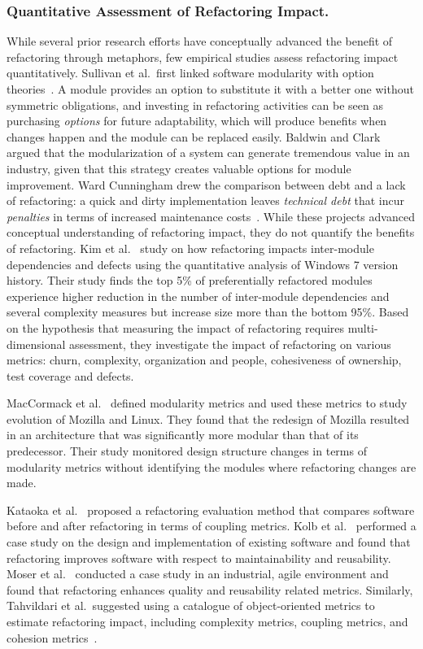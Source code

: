 \subsubsection{Quantitative Assessment of Refactoring Impact.} 
\label{sec:refactoringassessment} 
While several prior research efforts have conceptually advanced the benefit of refactoring through metaphors, few empirical studies assess refactoring impact quantitatively. Sullivan et al.~first linked software modularity with option theories~\cite{Sullivan1998:option}. A module provides an option to substitute it with a better one without symmetric obligations, and investing in refactoring activities can be seen as purchasing \emph{options} for future adaptability, which will produce benefits when changes happen and the module can be replaced easily. Baldwin and Clark~\cite{Baldwin1999:designrule} argued that the modularization of a system can generate tremendous value in an industry, given that this strategy creates valuable options for module improvement. Ward Cunningham drew the comparison between debt and a lack of refactoring: a quick and dirty implementation leaves {\em technical debt} that incur \emph{penalties} in terms of increased maintenance costs~\cite{Cunningham1992:td}. While these projects advanced conceptual understanding of refactoring impact, they do not quantify the benefits of refactoring.  Kim et al.~\cite{Kim2014:EmpiricalStudy} study on how refactoring impacts inter-module dependencies and defects using the quantitative analysis of Windows 7 version history. Their study finds the top 5\% of preferentially refactored modules experience higher reduction in the number of inter-module dependencies and several complexity measures but increase size more than the bottom 95\%. Based on the hypothesis that measuring the impact of refactoring requires multi-dimensional assessment, they investigate the impact of refactoring on various metrics: churn, complexity, organization and people, cohesiveness of ownership, test coverage and defects.     

MacCormack et al.~\cite{MacCormack2006:study} defined modularity metrics and used these metrics to study evolution of Mozilla and Linux. They found that the redesign of Mozilla resulted in an architecture that was significantly more modular than that of its predecessor. Their study monitored design structure changes in terms of modularity metrics without identifying the modules where refactoring changes are made. 

Kataoka et al.~\cite{Kataoka2002:metric} proposed a refactoring evaluation method that compares software before and after refactoring in terms of coupling metrics. Kolb et al.~\cite{Kolb2006:refactoring} performed a case study on the design and implementation of existing software and found that refactoring improves software with respect to maintainability and reusability. Moser et al.~\cite{Moser2006:refactoring} conducted a case study in an industrial, agile environment and found that refactoring enhances quality and reusability related metrics. Similarly, Tahvildari et al.~suggested using a catalogue of object-oriented metrics to estimate refactoring impact, including complexity metrics, coupling metrics, and cohesion metrics~\cite{Tahvildari2003:MAE}. 


